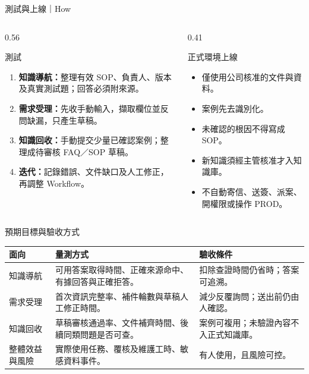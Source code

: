\documentclass[aspectratio=169,12pt]{beamer}
\begin{document}
\begin{frame}{測試與上線｜How}
\footnotesize
\begin{columns}[T,onlytextwidth]
\begin{column}{0.56\textwidth}
\begin{block}{測試}
\begin{enumerate}
\item \textbf{知識導航：}整理有效 SOP、負責人、版本及真實測試題；回答必須附來源。
\item \textbf{需求受理：}先收手動輸入，擷取欄位並反問缺漏，只產生草稿。
\item \textbf{知識回收：}手動提交少量已確認案例；整理成待審核 FAQ／SOP 草稿。
\item \textbf{迭代：}記錄錯誤、文件缺口及人工修正，再調整 Workflow。
\end{enumerate}
\end{block}
\end{column}
\begin{column}{0.41\textwidth}
\begin{alertblock}{正式環境上線}
\begin{itemize}
\item 僅使用公司核准的文件與資料。
\item 案例先去識別化。
\item 未確認的根因不得寫成 SOP。
\item 新知識須經主管核准才入知識庫。
\item 不自動寄信、送簽、派案、開權限或操作 PROD。
\end{itemize}
\end{alertblock}
\end{column}
\end{columns}
\end{frame}

\begin{frame}{預期目標與驗收方式}
\footnotesize
\begin{tabular}{p{}p{}p{}}
\toprule
\textbf{面向} & \textbf{量測方式} & \textbf{驗收條件} \\
\midrule
知識導航 & 可用答案取得時間、正確來源命中、有據回答與正確拒答。 & 扣除查證時間仍省時；答案可追溯。 \\
\addlinespace[0.6em]
需求受理 & 首次資訊完整率、補件輪數與草稿人工修正時間。 & 減少反覆詢問；送出前仍由人確認。 \\
\addlinespace[0.6em]
知識回收 & 草稿審核通過率、文件補齊時間、後續同類問題是否可查。 & 案例可複用；未驗證內容不入正式知識庫。 \\
\addlinespace[0.6em]
整體效益與風險 & 實際使用任務、覆核及維護工時、敏感資料事件。 & 有人使用，且風險可控。 \\
\bottomrule
\end{tabular}
\end{frame}
\end{document}
